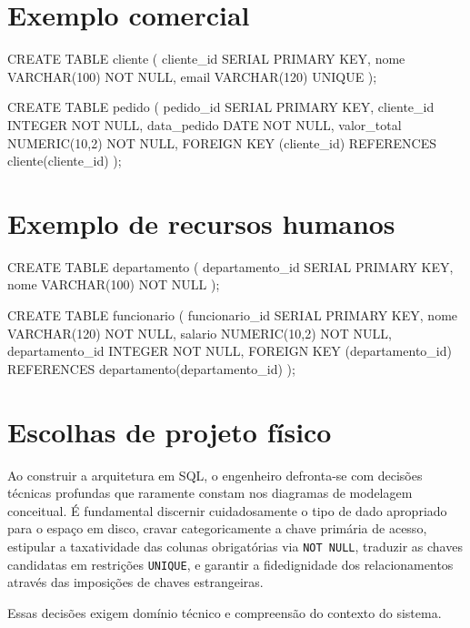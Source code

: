 \section{Exemplo comercial}

\begin{sqlcode}
CREATE TABLE cliente (
    cliente_id SERIAL PRIMARY KEY,
    nome VARCHAR(100) NOT NULL,
    email VARCHAR(120) UNIQUE
);
\end{sqlcode}

\begin{sqlcode}
CREATE TABLE pedido (
    pedido_id SERIAL PRIMARY KEY,
    cliente_id INTEGER NOT NULL,
    data_pedido DATE NOT NULL,
    valor_total NUMERIC(10,2) NOT NULL,
    FOREIGN KEY (cliente_id) REFERENCES cliente(cliente_id)
);
\end{sqlcode}

\section{Exemplo de recursos humanos}

\begin{sqlcode}
CREATE TABLE departamento (
    departamento_id SERIAL PRIMARY KEY,
    nome VARCHAR(100) NOT NULL
);
\end{sqlcode}

\begin{sqlcode}
CREATE TABLE funcionario (
    funcionario_id SERIAL PRIMARY KEY,
    nome VARCHAR(120) NOT NULL,
    salario NUMERIC(10,2) NOT NULL,
    departamento_id INTEGER NOT NULL,
    FOREIGN KEY (departamento_id) REFERENCES departamento(departamento_id)
);
\end{sqlcode}

\section{Escolhas de projeto físico}

Ao construir a arquitetura em SQL, o engenheiro defronta-se com decisões técnicas profundas que raramente constam nos diagramas de modelagem conceitual. É fundamental discernir cuidadosamente o tipo de dado apropriado para o espaço em disco, cravar categoricamente a chave primária de acesso, estipular a taxatividade das colunas obrigatórias via \texttt{NOT NULL}, traduzir as chaves candidatas em restrições \texttt{UNIQUE}, e garantir a fidedignidade dos relacionamentos através das imposições de chaves estrangeiras.

Essas decisões exigem domínio técnico e compreensão do contexto do sistema.

